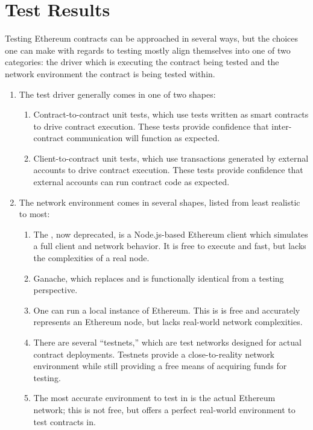 \section{Test Results}\label{sec:test-results}
Testing Ethereum contracts can be approached in several ways, but the choices
one can make with regards to testing mostly align themselves into one of two
categories: the driver which is executing the contract being tested and the
network environment the contract is being tested within.


\begin{enumerate}
  \item The test driver generally comes in one of two shapes:

    \begin{enumerate}
      \item Contract-to-contract unit tests, which use tests written as smart
        contracts to drive contract execution. These tests provide confidence
        that inter-contract communication will function as expected.

      \item Client-to-contract unit tests, which use transactions generated by
        external accounts to drive contract execution. These tests provide
        confidence that external accounts can run contract code as expected.
    \end{enumerate}

  \item The network environment comes in several shapes, listed from least
    realistic to most:

    \begin{enumerate}
      \item The , now deprecated, is a Node.js-based Ethereum
        client which simulates a full client and network behavior. It is free to
        execute and fast, but lacks the complexities of a real node.

      \item Ganache, which replaces  and is functionally
        identical from a testing perspective.

      \item One can run a local instance of Ethereum. This is is free and
        accurately represents an Ethereum node, but lacks real-world network
        complexities.

      \item There are several ``testnets,'' which are test networks designed for
        actual contract deployments. Testnets provide a close-to-reality network
        environment while still providing a free means of acquiring funds for
        testing.

      \item The most accurate environment to test in is the actual Ethereum
        network; this is not free, but offers a perfect real-world environment
        to test contracts in.
    \end{enumerate}
\end{enumerate}

